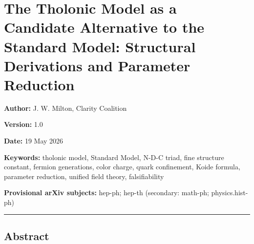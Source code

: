 \documentclass[
  11pt,
  letterpaper,
]{article}
\author{}
\date{}
\begin{document}
\section{The Tholonic Model as a Candidate Alternative to the Standard
Model: Structural Derivations and Parameter
Reduction}\label{the-tholonic-model-as-a-candidate-alternative-to-the-standard-model-structural-derivations-and-parameter-reduction}

\textbf{Author:} J. W. Milton, Clarity Coalition

\textbf{Version:} 1.0

\textbf{Date:} 19 May 2026

\textbf{Keywords:} tholonic model, Standard Model, N-D-C triad, fine
structure constant, fermion generations, color charge, quark
confinement, Koide formula, parameter reduction, unified field theory,
falsifiability

\textbf{Provisional arXiv subjects:} hep-ph; hep-th (secondary: math-ph;
physics.hist-ph)

\begin{center}\rule{0.5\linewidth}{0.5pt}\end{center}

\subsection{Abstract}\label{abstract}
\end{document}
